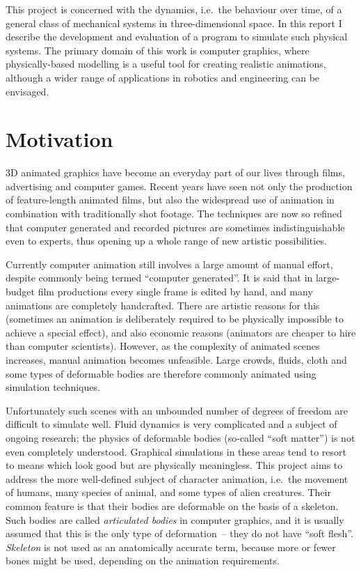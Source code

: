This project is concerned with the dynamics, i.e.\ the behaviour over time, of a general class
of mechanical systems in three-dimensional space. In this report I describe the development and
evaluation of a program to simulate such physical systems. The primary domain of this work is
computer graphics, where physically-based modelling is a useful tool for creating realistic
animations, although a wider range of applications in robotics and engineering can be envisaged.

\section{Motivation}

3D animated graphics have become an everyday part of our lives through films, advertising and
computer games. Recent years have seen not only the production of feature-length animated films,
but also the widespread use of animation in combination with traditionally shot footage. The
techniques are now so refined that computer generated and recorded pictures are sometimes
indistinguishable even to experts, thus opening up a whole range of new artistic possibilities.

Currently computer animation still involves a large amount of manual effort, despite commonly
being termed ``computer generated''. It is said that in large-budget film productions every single
frame is edited by hand, and many animations are completely handcrafted. There are artistic
reasons for this (sometimes an animation is deliberately required to be physically impossible
to achieve a special effect), and also economic reasons (animators are cheaper to hire than
computer scientists). However, as the complexity of animated scenes increases, manual animation
becomes unfeasible. Large crowds, fluids, cloth and some types of deformable bodies are therefore
commonly animated using simulation techniques.

Unfortunately such scenes with an unbounded number of degrees of freedom are difficult to simulate
well. Fluid dynamics is very complicated and a subject of ongoing research; the physics of
deformable bodies (so-called ``soft matter'') is not even completely understood. Graphical
simulations in these areas tend to resort to means which look good but are physically meaningless.
This project aims to address the more well-defined subject of character animation, i.e.\ the
movement of humans, many species of animal, and some types of alien creatures. Their common
feature is that their bodies are deformable on the basis of a skeleton. Such bodies are called
\emph{articulated bodies} in computer graphics, and it is usually assumed that this is the only
type of deformation~-- they do not have ``soft flesh''. \emph{Skeleton} is not used as an
anatomically accurate term, because more or fewer bones might be used, depending on the animation
requirements.

